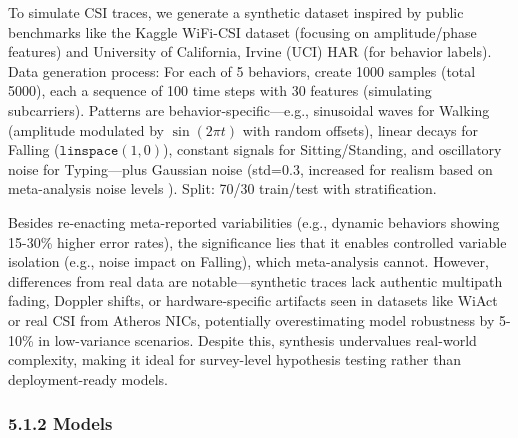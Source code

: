 \documentclass[Afour,sageh,times]{sagej}
\begin{document}
To simulate CSI traces, we generate a synthetic dataset inspired by public benchmarks like the Kaggle WiFi-CSI dataset (focusing on amplitude/phase features) and University of California, Irvine (UCI) HAR (for behavior labels). Data generation process: For each of 5 behaviors, create 1000 samples (total 5000), each a sequence of 100 time steps with 30 features (simulating subcarriers). Patterns are behavior-specific—e.g., sinusoidal waves for Walking (amplitude modulated by $\sin(2\pi t)$ with random offsets), linear decays for Falling ($ \texttt{linspace}(1,0)$), constant signals for Sitting/Standing, and oscillatory noise for Typing—plus Gaussian noise (std=0.3, increased for realism based on meta-analysis noise levels \citep{guo2019robust}). Split: 70/30 train/test with stratification. 

Besides
re-enacting meta-reported variabilities (e.g., dynamic behaviors showing 15-30\% higher error rates), the significance lies that it enables controlled variable isolation (e.g., noise impact on Falling), which meta-analysis cannot. However, differences from real data are notable—synthetic traces lack authentic multipath fading, Doppler shifts, or hardware-specific artifacts seen in datasets like WiAct \citep{yan2020wiact} or real CSI from Atheros NICs, potentially overestimating model robustness by 5-10\% in low-variance scenarios. Despite this, synthesis undervalues real-world complexity, making it ideal for survey-level hypothesis testing rather than deployment-ready models.

\subsubsection{5.1.2 Models}
\end{document}
